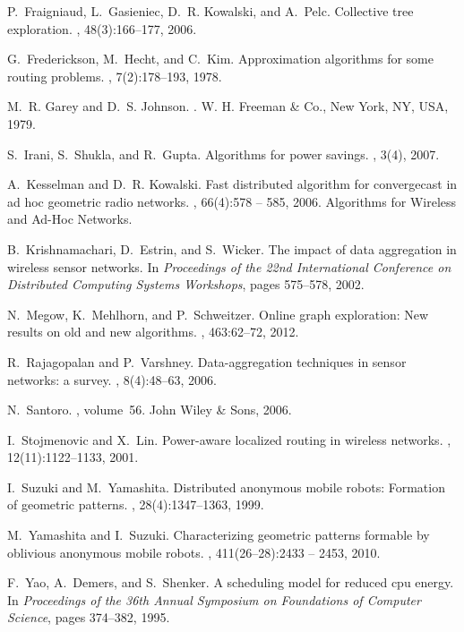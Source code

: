 \documentclass{article}
\begin{document}
\begin{thebibliography}{10}
P.~Fraigniaud, L.~Gasieniec, D.~R. Kowalski, and A.~Pelc.
\newblock Collective tree exploration.
, 48(3):166--177, 2006.

G.~Frederickson, M.~Hecht, and C.~Kim.
\newblock Approximation algorithms for some routing problems.
, 7(2):178--193, 1978.

M.~R. Garey and D.~S. Johnson.
.
\newblock W. H. Freeman \& Co., New York, NY, USA, 1979.

S.~Irani, S.~Shukla, and R.~Gupta.
\newblock Algorithms for power savings.
, 3(4), 2007.

A.~Kesselman and D.~R. Kowalski.
\newblock Fast distributed algorithm for convergecast in ad hoc geometric radio
  networks.
, 66(4):578 --
  585, 2006.
\newblock Algorithms for Wireless and Ad-Hoc Networks.

B.~Krishnamachari, D.~Estrin, and S.~Wicker.
\newblock The impact of data aggregation in wireless sensor networks.
\newblock In {\em Proceedings of the 22nd International Conference on Distributed Computing Systems Workshops}, pages 575--578, 2002.

N.~Megow, K.~Mehlhorn, and P.~Schweitzer.
\newblock Online graph exploration: New results on old and new algorithms.
, 463:62--72, 2012.

R.~Rajagopalan and P.~Varshney.
\newblock Data-aggregation techniques in sensor networks: a survey.
, 8(4):48--63, 2006.

N.~Santoro.
, volume~56.
\newblock John Wiley \& Sons, 2006.

I.~Stojmenovic and X.~Lin.
\newblock Power-aware localized routing in wireless networks.
,
  12(11):1122--1133, 2001.

I.~Suzuki and M.~Yamashita.
\newblock Distributed anonymous mobile robots: Formation of geometric patterns.
, 28(4):1347--1363, 1999.

M.~Yamashita and I.~Suzuki.
\newblock Characterizing geometric patterns formable by oblivious anonymous
  mobile robots.
, 411(26–28):2433 -- 2453, 2010.

F.~Yao, A.~Demers, and S.~Shenker.
\newblock A scheduling model for reduced cpu energy.
\newblock In {\em Proceedings of the 36th Annual Symposium on Foundations of Computer Science}, pages 374--382, 1995.

\end{thebibliography}
\end{document}
